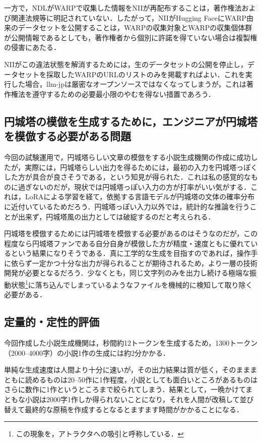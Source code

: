 \documentclass[10pt, a5paper, twoside]{jsarticle}
\theoremstyle{definition}
\begin{document}
		 	一方で，NDLがWARPで収集した情報をNIIが再配布することは，著作権法および関連法規等に明記されていない．したがって，NIIがHugging FaceにWARP由来のデータセットを公開することは，WARPの収集対象とWARPの収集個体群が公開情報であるとしても，著作権者から個別に許諾を得ていない場合は複製権の侵害にあたる．

		 	NIIがこの違法状態を解消するためには，生のデータセットの公開を停止し，データセットを採取したWARPのURLのリストのみを掲載すればよい．これを実行した場合，llm-jpは厳密なオープンソースではなくなってしまうが，これは著作権法を遵守するための必要最小限のやむを得ない措置であろう．

		\subsection{円城塔の模倣を生成するために，エンジニアが円城塔を模倣する必要がある問題}

			今回の試験運用で，円城塔らしい文章の模倣をする小説生成機関の作成に成功したが，実際には，円城塔らしい出力を得るためには，最初の入力を円城塔っぽくした方が具合が良さそうである，という知見が得られた．これは私の感覚的なものに過ぎないのだが，現状では円城塔っぽい入力の方が打率がいい気がする．これは，LoRAによる学習を経て，依拠する言語モデルが円城塔の文体の確率分布に近付いているためだろう．円城塔っぽい入力以外では，統計的な推論を行うことが出来ず，円城塔風の出力としては破綻するのだと考えられる．

			円城塔を模倣するためには円城塔を模倣する必要があるのはそうなのだが，この程度なら円城塔ファンである自分自身が模倣した方が精度・速度ともに優れているという結果になりそうである．真に工学的な生成を目指すのであれば，操作手に依らず一定かつ十分な出力が得られることが期待されるため，より一層の技術開発が必要となるだろう．少なくとも，同じ文字列のみを出力し続ける極端な振動状態\footnote{この現象を，アトラクタへの吸引と呼称している．}に落ち込んでしまっているようなファイルを機械的に検知して取り除く必要がある．

		\subsection{定量的・定性的評価}

			今回作成した小説生成機関は，秒間約12トークンを生成するため，1300トークン（2000--4000字）の小説1作の生成には約2分かかる．

			単純な生成速度は人間より十分に速いが，その出力結果は質が低く，そのまままともに読めるものは20--50作に1作程度，小説としても面白いところがあるものはさらに数作に1作というところまで絞られてしまう．結果として，一晩かけてまともな小説は2000字1作しか得られないことになり，それを人間が改稿して並び替えて最終的な原稿を作成するとなるとますます時間がかかることになる．
\end{document}
